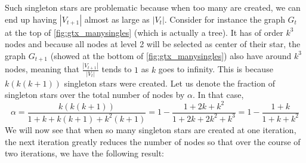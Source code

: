 Such singleton stars are problematic because when too many are created, we can end up having
$|V_{t+1}|$ almost as large as $|V_t|$. Consider for instance the graph $G_t$ at the top of
\autoref{fig:gtx_manysingles} (which is actually a tree). It has of order $k^3$ nodes and because
all nodes at level 2 will be selected as center of their star, the graph $G_{t+1}$ (showed at the
bottom of \autoref{fig:gtx_manysingles}) also have around $k^3$ nodes, meaning that
$\frac{|V_{t+1}|}{|V_t|}$ tends to $1$ as $k$ goes to infinity. This is because
$k\left(k(k+1)\right)$ singleton stars were created. Let us denote the fraction of singleton stars
over the total number of nodes by $\alpha$. In that case,
$$\alpha = \frac{k\left(k(k+1)\right)}{1+k+k(k+1)+k^2(k+1)}
= 1 - \frac{1+2k+k^2}{1+2k+2k^2+k^3}
= 1 - \frac{1+k}{1+k+k^2}$$
We will now see that when so many singleton stars are created at one iteration, the next iteration
greatly reduces the number of nodes so that over the course of two iterations, we have the following
result:
